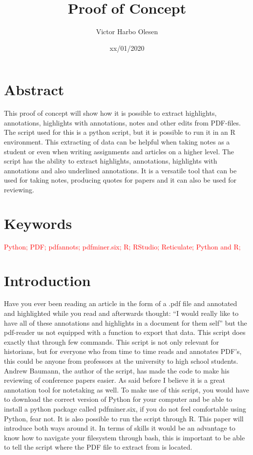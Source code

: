 \documentclass{article}
\title{Proof of Concept}
\author{Victor Harbo Olesen}
\date{xx/01/2020}
\begin{document}
\maketitle

\section{Abstract}
This proof of concept will show how it is possible to extract highlights, annotations, highlights with annotations, notes and other edits from PDF-files. The script used for this is a python script, but it is possible to run it in an R environment. This extracting of data can be helpful when taking notes as a student or even when writing assignments and articles on a higher level. The script has the ability to extract highlights, annotations, highlights with annotations and also underlined annotations. It is a versatile tool that can be used for taking notes, producing quotes for papers and it can also be used for reviewing.
\section{Keywords}
\textcolor{red}{Python; PDF; pdfannots; pdfminer.six; R; RStudio; Reticulate; Python and R;} 
\section{Introduction}
Have you ever been reading an article in the form of a .pdf file and annotated and highlighted while you read and afterwards thought: “I would really like to have all of these annotations and highlights in a document for them self” but the pdf-reader us not equipped with a function to export that data. This script does exactly that through few commands. This script is not only relevant for historians, but for everyone who from time to time reads and annotates PDF’s, this could be anyone from professors at the university to high school students. Andrew Baumann, the author of the script, has made the code to make his reviewing of conference papers easier. As said before I believe it is a great annotation tool for notetaking as well. \newline
To make use of this script, you would have to download the correct version of Python for your computer and be able to install a python package called pdfminer.six, if you do not feel comfortable using Python, fear not. It is also possible to run the script through R. This paper will introduce both ways around it. In terms of skills it would be an advantage to know how to navigate your filesystem through bash, this is important to be able to tell the script where the PDF file to extract from is located. 
\end{document}
